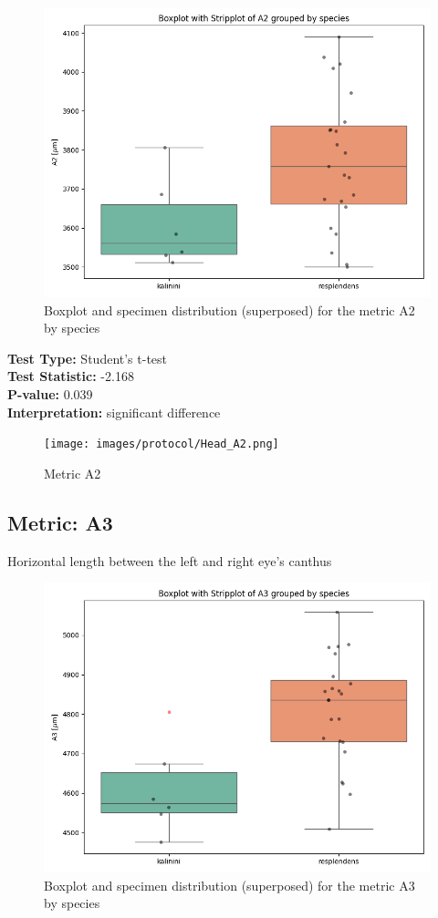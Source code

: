 \begin{figure}[H]
\centering
\includegraphics[width=0.7\linewidth]{images/boxplot/boxplot_A2.png}
\caption{  Boxplot and specimen distribution (superposed) for the metric  A2 by species}
\end{figure}

\noindent\textbf{Test Type:} Student's t-test \\
\noindent\textbf{Test Statistic:} -2.168 \\
\noindent\textbf{P-value:} 0.039 \\
\noindent\textbf{Interpretation:} significant difference

\begin{figure}[H]
\centering
\texttt{[image: images/protocol/Head\_A2.png]}
\caption{ Metric A2}
\end{figure}

\newpage
\subsection*{Metric: A3}

Horizontal length between the left and right eye’s canthus

\begin{figure}[H]
\centering
\includegraphics[width=0.7\linewidth]{images/boxplot/boxplot_A3.png}
\caption{  Boxplot and specimen distribution (superposed) for the metric  A3 by species}
\end{figure}

